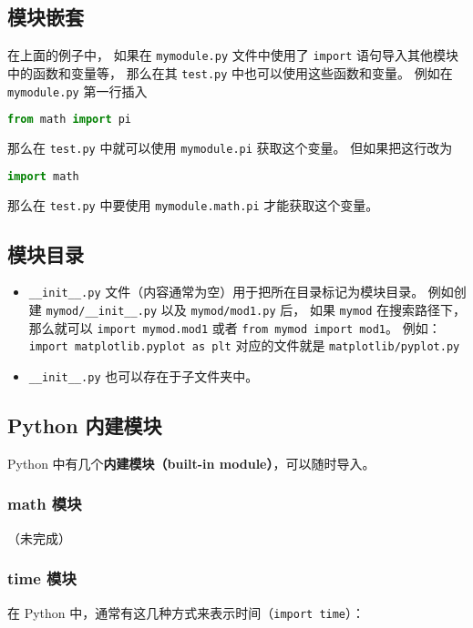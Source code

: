 \subsection{模块嵌套}
在上面的例子中， 如果在 \verb`mymodule.py` 文件中使用了 \verb`import` 语句导入其他模块中的函数和变量等， 那么在其 \verb`test.py` 中也可以使用这些函数和变量。 例如在 \verb`mymodule.py` 第一行插入
\begin{lstlisting}[language=python]
from math import pi
\end{lstlisting}
那么在 \verb`test.py` 中就可以使用 \verb`mymodule.pi` 获取这个变量。 但如果把这行改为
\begin{lstlisting}[language=python]
import math
\end{lstlisting}
那么在 \verb`test.py` 中要使用 \verb`mymodule.math.pi` 才能获取这个变量。

\subsection{模块目录}
\begin{itemize}
\item \verb`__init__.py` 文件（内容通常为空）用于把所在目录标记为模块目录。 例如创建 \verb`mymod/__init__.py` 以及 \verb`mymod/mod1.py` 后， 如果 \verb`mymod` 在搜索路径下， 那么就可以 \verb`import mymod.mod1` 或者 \verb`from mymod import mod1`。 例如： \verb`import matplotlib.pyplot as plt` 对应的文件就是 \verb`matplotlib/pyplot.py`
\item \verb`__init__.py` 也可以存在于子文件夹中。
\end{itemize}


\subsection{Python 内建模块}
Python 中有几个\textbf{内建模块（built-in module）}，可以随时导入。

\subsubsection{math 模块}
（未完成）

\subsubsection{time 模块}
在 Python 中，通常有这几种方式来表示时间（\verb`import time`）：

